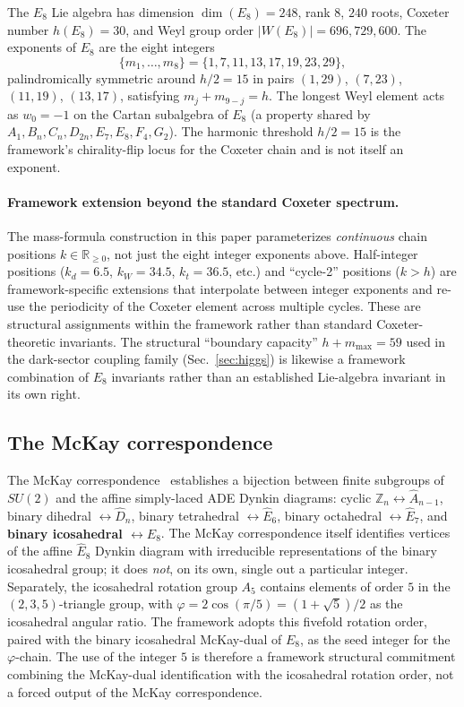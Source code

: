 ﻿\documentclass[reprint,amsmath,amssymb,aps,prd,longbibliography,floatfix]{revtex4-2}
\begin{document}
The $E_8$ Lie algebra has dimension $\dim(E_8) = 248$, rank $8$,
$240$ roots, Coxeter number $h(E_8) = 30$, and Weyl group order
$|W(E_8)| = 696{,}729{,}600$. The exponents of $E_8$ are the eight
integers
\begin{equation}
\{m_1, \ldots, m_8\} = \{1, 7, 11, 13, 17, 19, 23, 29\},
\end{equation}
palindromically symmetric around $h/2 = 15$ in pairs $(1, 29)$,
$(7, 23)$, $(11, 19)$, $(13, 17)$, satisfying $m_j + m_{9-j} = h$.
The longest Weyl element acts as $w_0 = -1$ on the Cartan
subalgebra of $E_8$ (a property shared by $A_1, B_n, C_n, D_{2n},
E_7, E_8, F_4, G_2$). The harmonic threshold $h/2 = 15$ is the
framework's chirality-flip locus for the Coxeter chain and is not
itself an exponent.

\paragraph{Framework extension beyond the standard Coxeter spectrum.}
The mass-formula construction in this paper parameterizes
\emph{continuous} chain positions $k \in \mathbb{R}_{\geq 0}$, not
just the eight integer exponents above. Half-integer positions
($k_d = 6.5$, $k_W = 34.5$, $k_t = 36.5$, etc.) and
``cycle-2'' positions ($k > h$) are framework-specific extensions
that interpolate between integer exponents and re-use the
periodicity of the Coxeter element across multiple cycles. These are
structural assignments within the framework rather than standard
Coxeter-theoretic invariants. The structural ``boundary capacity''
$h + m_{\max} = 59$ used in the dark-sector coupling family
(Sec.~\ref{sec:higgs}) is likewise a framework combination of
$E_8$ invariants rather than an established Lie-algebra invariant
in its own right.

\subsection{The McKay correspondence}

The McKay correspondence~\cite{McKay1980} establishes a bijection
between finite subgroups of $SU(2)$ and the affine simply-laced ADE
Dynkin diagrams: cyclic $\mathbb{Z}_n \leftrightarrow \widehat{A}_{n-1}$,
binary dihedral $\leftrightarrow \widehat{D}_n$, binary tetrahedral
$\leftrightarrow \widehat{E}_6$, binary octahedral
$\leftrightarrow \widehat{E}_7$, and \textbf{binary icosahedral
$\leftrightarrow \widehat{E}_8$}. The McKay correspondence itself
identifies vertices of the affine $\widehat{E}_8$ Dynkin diagram
with irreducible representations of the binary icosahedral group;
it does \emph{not}, on its own, single out a particular integer.
Separately, the icosahedral rotation group $A_5$ contains elements
of order $5$ in the $(2,3,5)$-triangle group, with
$\varphi = 2\cos(\pi/5) = (1+\sqrt{5})/2$ as the icosahedral angular
ratio. The framework adopts this fivefold rotation order, paired
with the binary icosahedral McKay-dual of $E_8$, as the seed integer
for the $\varphi$-chain. The use of the integer $5$ is therefore a
framework structural commitment combining the McKay-dual
identification with the icosahedral rotation order, not a forced
output of the McKay correspondence.
\end{document}

